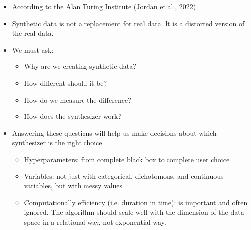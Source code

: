 \documentclass[t,8pt,utfx8]{beamer}
\begin{document}
\begin{spacing}{1.25}
{\begin{itemize}
    \item According to the Alan Turing Institute (Jordan et al., 2022)
    \item Synthetic data is not a replacement for real data.  It is a distorted version of the real data.
    \item We must ask: 
    \begin{itemize}
        \item Why are we creating synthetic data?  
        \item How different should it be?  
        \item How do we measure the difference?  
        \item How does the synthesizer work? 
    \end{itemize}
    \item Answering these questions will help us make decisions about which synthesizer is the right choice
    \begin{itemize}
        \item Hyperparameters: from complete black box to complete user choice
        \item Variables: not just with categorical, dichotomous, and continuous variables, but with messy values 
        \item Computationally efficiency (i.e. duration in time): is important and often ignored.  The algorithm should scale well with the dimension of the data space in a relational way, not exponential way.
    \end{itemize}
\end{itemize}
}




\end{spacing}
\end{document}
